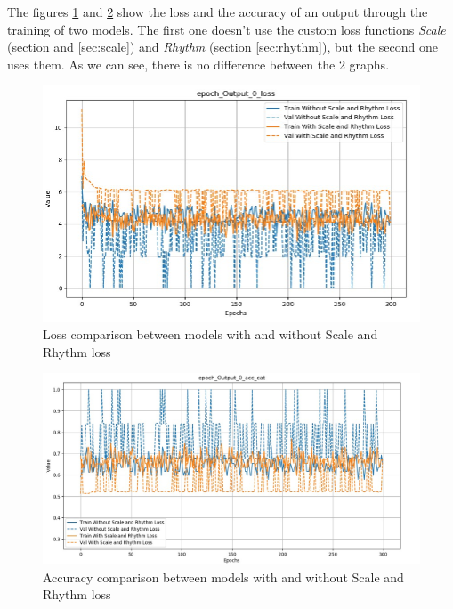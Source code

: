 \documentclass[12pt]{report}
\begin{document}
The figures \ref{fig:loss-comparison-scale-rhythm} and \ref{fig:acc-comparison-scale-rhythm} show the loss and the accuracy of an output through the training of two models.
The first one doesn't use the custom loss functions \textit{Scale} (section and \ref{sec:scale}) and \textit{Rhythm} (section \ref{sec:rhythm}), but the second one uses them.
As we can see, there is no difference between the 2 graphs.

\begin{figure}[ht]
    \centering
    \includegraphics[width=\textwidth]{images/experiences/scale_rhythm/loss-comparison-scale-rhythm.jpg}
    \caption{Loss comparison between models with and without Scale and Rhythm loss}
    \label{fig:loss-comparison-scale-rhythm}
\end{figure}

\begin{figure}[ht]
    \centering
    \includegraphics[width=\textwidth]{images/experiences/scale_rhythm/acc-comparison-scale-rhythm.jpg}
    \caption{Accuracy comparison between models with and without Scale and Rhythm loss}
    \label{fig:acc-comparison-scale-rhythm}
\end{figure}
\end{document}
